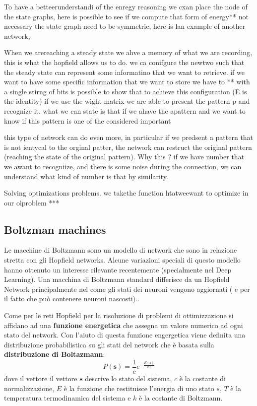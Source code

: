 \documentclass{article}
\begin{document}
To have a betteerunderstandi of the enregy reasoning we cxan place the node of the state graphs, here is
possible to see if we compute that form of energy**
not necessary the state graph need to be symmetric, here is lan example of another network,


When we arereaching a steady state we ahve a memory of what we are recording, this is what the
hopfield allows us to do. we ca conifgure the newtwo such that the steady state can represent some
informatino that we want to retrieve. if we want to have some specific information that we want to store we
have to **
with a single stirng of bits is possible to show that to achieve this configuration
(E is the identity) if we use the wight matrix we are able to present the pattern p
and recognize it.
what we can state is that if we ahave the apattern and we want to know if this pattern is one
of the considered important

this type of network can do even more, in particular if we predsent a pattern that is not ientycal to the
orginal patter, the network can restruct the original pattern (reaching the state of the original
pattern). Why this ? if we have number that we awant to recogniize, and there is some noise
during the connection, we can understand what kind of number is that by similarity.

Solving optimizations problems. we takethe function htatweewant to optimize in our oìproblem
***
\subsection{Boltzman machines}
Le macchine di Boltzmann sono un modello di network che sono in relazione stretta con gli
Hopfield networks.
Alcune variazioni speciali di questo modello hanno ottenuto un interesse rilevante
recentemente (specialmente nel Deep Learning). Una macchina di Boltzmann standard differisce
da un Hopfield Network principalmente nel come gli stati dei neuroni vengono aggiornati (
e per il fatto che può contenere neuroni nascosti)..

Come per le reti Hopfield per la risoluzione di problemi di ottimizzazione si affidano ad
una \textbf{funzione energetica} che assegna un valore numerico ad ogni stato del network. Con
l'aiuto di questa funzione engergetica viene definita una distribuzione probabilistica su gli
stati del network che è basata sulla \textbf{distribuzione di Boltazmann}:
$$P(\textbf{s})=\frac{1}{c}e^{-\frac{E(\textbf{s})}{kT}}$$
dove il vettore il vettore $\textbf{s}$ descrive lo stato del sistema, $c$ è la costante di
normalizzazione, $E$ è la funzione che restituisce l'energia di uno stato $s$, $T$ è la temperatura
termodinamica del sistema e $k$ è la costante di Boltzmann.
\end{document}
